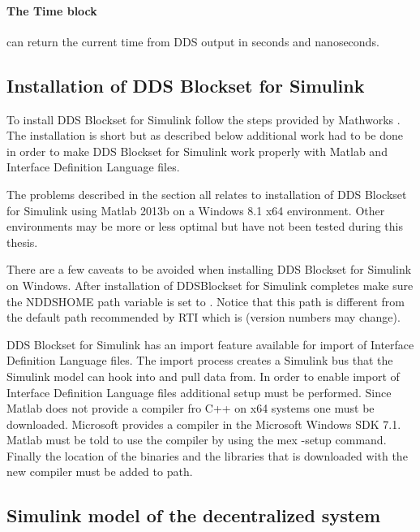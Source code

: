 \paragraph{The Time block} can return the current time from DDS output in seconds and nanoseconds.

\subsection{Installation of DDS Blockset for Simulink}
To install DDS Blockset for Simulink follow the steps provided by Mathworks \cite{DDSBlocksetPilotSupportPackageUserGuide}. The installation is short but as described below additional work had to be done in order to make DDS Blockset for Simulink work properly with Matlab and Interface Definition Language files.

The problems described in the section all relates to installation of DDS Blockset for Simulink using Matlab 2013b on a Windows 8.1 x64 environment.
Other environments may be more or less optimal but have not been tested during this thesis.

There are a few caveats to be avoided when installing DDS Blockset for Simulink on Windows.
After installation of DDSBlockset for Simulink completes make sure the NDDSHOME path variable is set to .
Notice that this path is different from the default path recommended by RTI which is  (version numbers may change).

DDS Blockset for Simulink has an import feature available for import of Interface Definition Language files. The import process creates a Simulink bus that the Simulink model can hook into and pull data from. In order to enable import of Interface Definition Language files additional setup must be performed.
Since Matlab does not provide a compiler fro C++ on x64 systems one must be downloaded. Microsoft provides a compiler in the Microsoft Windows SDK 7.1. Matlab must be told to use the compiler by using the mex -setup command. Finally the location of the binaries and the libraries that is downloaded with the new compiler must be added to path.

\subsection{Simulink model of the decentralized system}\label{subsec:decentralizedmodel}

